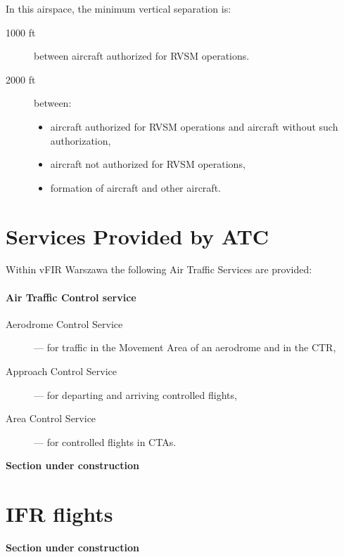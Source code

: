 In this airspace, the minimum vertical separation is:
\begin{description}
    \item[1000 ft] between aircraft authorized for RVSM operations.
    \item[2000 ft] between:
    \begin{itemize}
        \item aircraft authorized for RVSM operations and aircraft without such authorization,
        \item aircraft not authorized for RVSM operations,
        \item formation of aircraft and other aircraft.
    \end{itemize} 
\end{description}

\clearpage%
\section{Services Provided by ATC}%
\label{sect:airspace:services}

Within vFIR Warszawa the following Air Traffic Services are provided:
\paragraph{Air Traffic Control service}
\begin{description}
    \item[Aerodrome Control Service] --- for traffic in the Movement Area of an aerodrome and in the CTR,
    \item[Approach Control Service] --- for departing and arriving controlled flights,
    \item[Area Control Service] --- for controlled flights in CTAs. 
\end{description}

\begin{tcolorbox}[
    colback=orange!10!white,
    colframe=orange,
    title=\LARGE\textbf{Warning},
    before title={\faExclamationTriangle~}
]
    \textbf{Section under construction}
\end{tcolorbox}

\section{IFR flights}%
\begin{tcolorbox}[
    colback=orange!10!white,
    colframe=orange,
    title=\LARGE\textbf{Warning},
    before title={\faExclamationTriangle~}
]
    \textbf{Section under construction}
\end{tcolorbox}
